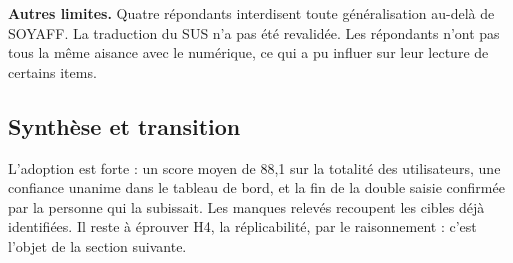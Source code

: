\textbf{Autres limites.} Quatre répondants interdisent toute généralisation au-delà de SOYAFF. La traduction du SUS n'a pas été revalidée. Les répondants n'ont pas tous la même aisance avec le numérique, ce qui a pu influer sur leur lecture de certains items.

\subsection{Synthèse et transition}
\label{sec:adoption_synthese}

L'adoption est forte : un score moyen de 88,1 sur la totalité des utilisateurs, une confiance unanime dans le tableau de bord, et la fin de la double saisie confirmée par la personne qui la subissait. Les manques relevés recoupent les cibles déjà identifiées. Il reste à éprouver H4, la réplicabilité, par le raisonnement : c'est l'objet de la section suivante.
